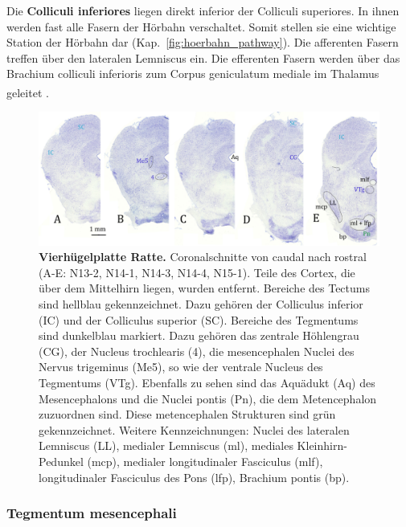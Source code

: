 \noindent Die \textbf{Colliculi inferiores} liegen direkt inferior der Colliculi superiores. In ihnen werden fast alle Fasern der Hörbahn verschaltet. Somit stellen sie eine wichtige Station der Hörbahn dar (Kap.~\ref{fig:hoerbahn_pathway}). Die afferenten Fasern treffen über den lateralen Lemniscus ein. Die efferenten Fasern werden über das Brachium colliculi inferioris zum Corpus geniculatum mediale im Thalamus geleitet \textsuperscript{\cite[Kap.~6]{trepel2011neuroanatomie}}.

\begin{figure}[H]
    \centering
    \includegraphics[width=\textwidth]{pictures/Bilder_Jule/Ratte/SC_IC.png}
    \caption[Vierhügelplatte Ratte]{\textbf{Vierhügelplatte Ratte.} Coronalschnitte von caudal nach rostral (A-E: N13-2, N14-1, N14-3, N14-4, N15-1). Teile des Cortex, die über dem Mittelhirn liegen, wurden entfernt. Bereiche des Tectums sind hellblau gekennzeichnet. Dazu gehören der Colliculus inferior (IC) und der Colliculus superior (SC). Bereiche des Tegmentums sind dunkelblau markiert. Dazu gehören das zentrale Höhlengrau (CG), der Nucleus trochlearis (4), die mesencephalen Nuclei des Nervus trigeminus (Me5), so wie der ventrale Nucleus des Tegmentums (VTg). Ebenfalls zu sehen sind das Aquädukt (Aq) des Mesencephalons und die Nuclei pontis (Pn), die dem Metencephalon zuzuordnen sind. Diese metencephalen Strukturen sind grün gekennzeichnet. Weitere Kennzeichnungen: Nuclei des lateralen Lemniscus (LL), medialer Lemniscus (ml), mediales Kleinhirn-Pedunkel (mcp), medialer longitudinaler Fasciculus (mlf), longitudinaler Fasciculus des Pons (lfp), Brachium pontis (bp).  }
    \label{fig:vierhuegelplatte_ratte}
\end{figure}{}

\subsubsection{Tegmentum mesencephali}

